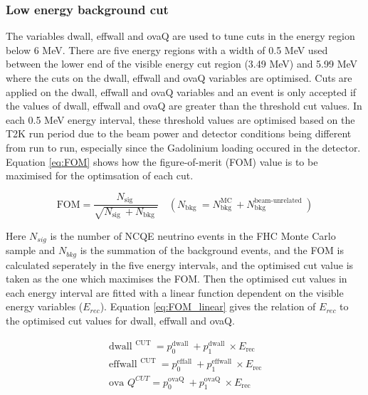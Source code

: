\subsubsection{Low energy background cut}

The variables dwall, effwall and ovaQ are used to tune cuts in the energy region below 6 MeV. There are five energy regions with a width of 0.5 MeV used between the lower end of the visible energy cut region (3.49 MeV) and 5.99 MeV where the cuts on the dwall, effwall and ovaQ variables are optimised. Cuts are applied on the dwall, effwall and ovaQ variables and an event is only accepted if the values of dwall, effwall and ovaQ are greater than the threshold cut values. In each 0.5 MeV energy interval, these threshold values are optimised based on the T2K run period due to the beam power and detector conditions being different from run to run, especially since the Gadolinium loading occured in the detector. Equation \ref{eq:FOM} shows how the figure-of-merit (FOM) value is to be maximised for the optimsation of each cut.

\begin{equation}
    \mathrm{FOM}=\frac{N_{\text {sig }}}{\sqrt{N_{\text {sig }}+N_{\text {bkg }}}} \quad\left(N_{\text {bkg }}=N_{\text {bkg }}^{\mathrm{MC}}+N_{\text {bkg }}^{\text {beam-unrelated }}\right)
\label{eq:FOM}
\end{equation}

Here $N_{sig}$ is the number of NCQE neutrino events in the FHC Monte Carlo sample and $N_{bkg}$ is the summation of the background events, and the FOM is calculated seperately in the five energy intervals, and the optimised cut value is taken as the one which maximises the FOM. Then the optimised cut values in each energy interval are fitted with a linear function dependent on the visible energy variables ($E_{rec}$). Equation \ref{eq:FOM_linear} gives the relation of $E_{rec}$ to the optimised cut values for dwall, effwall and ovaQ.

\begin{align}
    \text { dwall }^{\text {CUT }} =p_{0}^{\text {dwall }}+p_{1}^{\text {dwall }} \times E_{\text {rec }} \\
    \text { effwall }^{\text {CUT }}=p_{0}^{\text {effall }}+p_{1}^{\text {effwall }} \times E_{\text {rec }} \\
    \text { ova } Q^{C U T}=p_{0}^{\text {ovaQ }}+p_{1}^{\text {ovaQ }} \times E_{\text {rec }}
\label{eq:FOM_linear}
\end{align}


